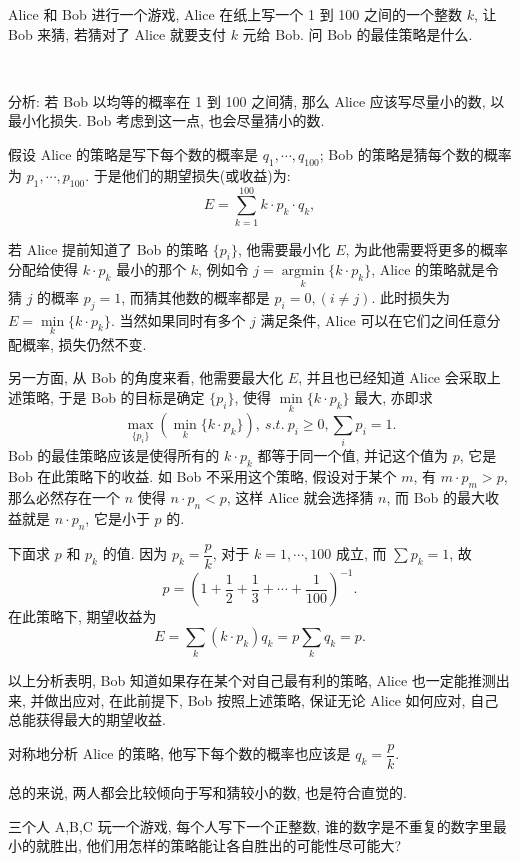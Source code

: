 \newpage
Alice 和 Bob 进行一个游戏, Alice 在纸上写一个 1 到 100 之间的一个整数 $k$, 让 Bob 来猜, 若猜对了 Alice 就要支付 $k$ 元给 Bob. 问 Bob 的最佳策略是什么.

~

分析: 若 Bob 以均等的概率在 1 到 100 之间猜, 那么 Alice 应该写尽量小的数, 以最小化损失. Bob 考虑到这一点, 也会尽量猜小的数. 

假设 Alice 的策略是写下每个数的概率是 $q_1, \cdots, q_{100}$; Bob 的策略是猜每个数的概率为 $p_1, \cdots, p_{100}$. 于是他们的期望损失(或收益)为:
\[ E = \sum_{k=1}^{100}k\cdot p_k\cdot q_k ,\]

若 Alice 提前知道了 Bob 的策略 $\{p_i\}$, 他需要最小化 $E$, 为此他需要将更多的概率分配给使得 $k\cdot p_k$ 最小的那个 $k$, 例如令 $j = \mathop{\arg\min}\limits_{k}\{k\cdot p_k\}$, Alice 的策略就是令猜 $j$ 的概率 $p_j = 1$, 而猜其他数的概率都是 $p_i = 0, (i\neq j)$. 此时损失为 $E = \min\limits_{k}\{k\cdot p_k\}$. 当然如果同时有多个 $j$ 满足条件, Alice 可以在它们之间任意分配概率, 损失仍然不变.

另一方面, 从 Bob 的角度来看, 他需要最大化 $E$, 并且也已经知道 Alice 会采取上述策略, 于是 Bob 的目标是确定 $\{p_i\}$, 使得 $\min\limits_{k}\{k\cdot p_k\}$ 最大, 亦即求
\[ \max\limits_{\{p_i\}}\left( \min\limits_{k}\{k\cdot p_k\} \right),\ s.t.\ p_i\ge 0, \sum_i p_i = 1 .\]
Bob 的最佳策略应该是使得所有的 $k\cdot p_k$ 都等于同一个值, 并记这个值为 $p$, 它是 Bob 在此策略下的收益. 如 Bob 不采用这个策略, 假设对于某个 $m$, 有 $m\cdot p_m > p$, 那么必然存在一个 $n$ 使得 $n\cdot p_n < p$, 这样 Alice 就会选择猜 $n$, 而 Bob 的最大收益就是 $n\cdot p_n$, 它是小于 $p$ 的.

下面求 $p$ 和 $p_k$ 的值. 因为 $p_k = \dfrac{p}{k}$, 对于 $k=1,\cdots,100$ 成立, 而 $\sum p_k = 1$, 故
\[p = \left(1 + \frac{1}{2} + \frac{1}{3} + \cdots + \frac{1}{100}\right)^{-1} .\]
在此策略下, 期望收益为
\[ E = \sum_k(k\cdot p_k)q_k = p\sum_kq_k = p .\]

以上分析表明, Bob 知道如果存在某个对自己最有利的策略, Alice 也一定能推测出来, 并做出应对, 在此前提下, Bob 按照上述策略, 保证无论 Alice 如何应对, 自己总能获得最大的期望收益. 

对称地分析 Alice 的策略, 他写下每个数的概率也应该是 $q_k = \dfrac{p}{k}$.

总的来说, 两人都会比较倾向于写和猜较小的数, 也是符合直觉的.


\newpage
三个人 A,B,C 玩一个游戏, 每个人写下一个正整数, 谁的数字是不重复的数字里最小的就胜出, 他们用怎样的策略能让各自胜出的可能性尽可能大?

